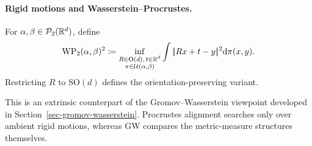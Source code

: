 \paragraph{Rigid motions and Wasserstein--Procrustes.}
\begin{defn}\label{def-wasserstein-procrustes}
For $\alpha,\beta\in\mathcal{P}_2(\mathbb{R}^d)$, define
\[
\operatorname{WP}_2(\alpha,\beta)^2
\coloneqq
\inf_{\substack{R\in\mathrm O(d),\,t\in\mathbb{R}^d\\ \pi\in\mathcal{U}(\alpha,\beta)}}
\int|\!| Rx+t-y |\!|^2\mathrm{d}\pi(x,y).
\]
Restricting \(R\) to \(\mathrm{SO}(d)\) defines the orientation-preserving variant.
\end{defn}
This is an extrinsic counterpart of the Gromov--Wasserstein viewpoint developed in Section~\ref{sec-gromov-wasserstein}. Procrustes alignment searches only over ambient rigid motions, whereas GW compares the metric-measure structures themselves.

